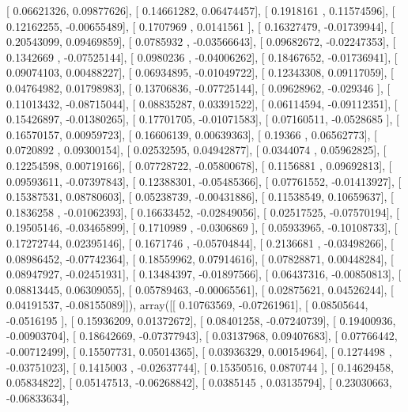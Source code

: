 \documentclass{article}
\begin{document}
       [ 0.06621326,  0.09877626],
       [ 0.14661282,  0.06474457],
       [ 0.1918161 ,  0.11574596],
       [ 0.12162255, -0.00655489],
       [ 0.1707969 ,  0.0141561 ],
       [ 0.16327479, -0.01739944],
       [ 0.20543099,  0.09469859],
       [ 0.0785932 , -0.03566643],
       [ 0.09682672, -0.02247353],
       [ 0.1342669 , -0.07525144],
       [ 0.0980236 , -0.04006262],
       [ 0.18467652, -0.01736941],
       [ 0.09074103,  0.00488227],
       [ 0.06934895, -0.01049722],
       [ 0.12343308,  0.09117059],
       [ 0.04764982,  0.01798983],
       [ 0.13706836, -0.07725144],
       [ 0.09628962, -0.029346  ],
       [ 0.11013432, -0.08715044],
       [ 0.08835287,  0.03391522],
       [ 0.06114594, -0.09112351],
       [ 0.15426897, -0.01380265],
       [ 0.17701705, -0.01071583],
       [ 0.07160511, -0.0528685 ],
       [ 0.16570157,  0.00959723],
       [ 0.16606139,  0.00639363],
       [ 0.19366   ,  0.06562773],
       [ 0.0720892 ,  0.09300154],
       [ 0.02532595,  0.04942877],
       [ 0.0344074 ,  0.05962825],
       [ 0.12254598,  0.00719166],
       [ 0.07728722, -0.05800678],
       [ 0.1156881 ,  0.09692813],
       [ 0.09593611, -0.07397843],
       [ 0.12388301, -0.05485366],
       [ 0.07761552, -0.01413927],
       [ 0.15387531,  0.08780603],
       [ 0.05238739, -0.00431886],
       [ 0.11538549,  0.10659637],
       [ 0.1836258 , -0.01062393],
       [ 0.16633452, -0.02849056],
       [ 0.02517525, -0.07570194],
       [ 0.19505146, -0.03465899],
       [ 0.1710989 , -0.0306869 ],
       [ 0.05933965, -0.10108733],
       [ 0.17272744,  0.02395146],
       [ 0.1671746 , -0.05704844],
       [ 0.2136681 , -0.03498266],
       [ 0.08986452, -0.07742364],
       [ 0.18559962,  0.07914616],
       [ 0.07828871,  0.00448284],
       [ 0.08947927, -0.02451931],
       [ 0.13484397, -0.01897566],
       [ 0.06437316, -0.00850813],
       [ 0.08813445,  0.06309055],
       [ 0.05789463, -0.00065561],
       [ 0.02875621,  0.04526244],
       [ 0.04191537, -0.08155089]]), array([[ 0.10763569, -0.07261961],
       [ 0.08505644, -0.0516195 ],
       [ 0.15936209,  0.01372672],
       [ 0.08401258, -0.07240739],
       [ 0.19400936, -0.00903704],
       [ 0.18642669, -0.07377943],
       [ 0.03137968,  0.09407683],
       [ 0.07766442, -0.00712499],
       [ 0.15507731,  0.05014365],
       [ 0.03936329,  0.00154964],
       [ 0.1274498 , -0.03751023],
       [ 0.1415003 , -0.02637744],
       [ 0.15350516,  0.0870744 ],
       [ 0.14629458,  0.05834822],
       [ 0.05147513, -0.06268842],
       [ 0.0385145 ,  0.03135794],
       [ 0.23030663, -0.06833634],
\end{document}

